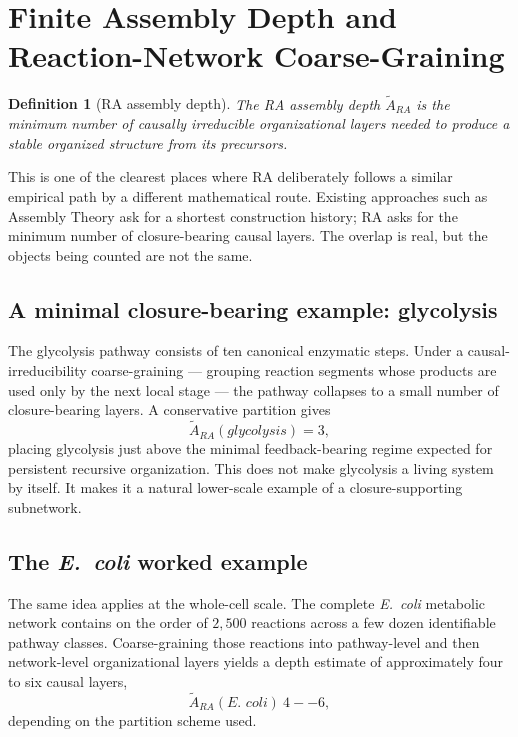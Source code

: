 \documentclass[11pt]{article}
\def\mathrm#1{#1}%
\def\text#1{#1}%
\def\approx{~}%
\newtheorem{definition}{Definition}
\begin{document}
\section{Finite Assembly Depth and Reaction-Network Coarse-Graining}
\label{sec:assembly}

\begin{definition}[RA assembly depth]
The RA assembly depth $\tilde{A}_{\mathrm{RA}}$ is the minimum number of causally irreducible organizational layers needed to produce a stable organized structure from its precursors.
\end{definition}

This is one of the clearest places where RA deliberately follows a similar empirical path by a different mathematical route. Existing approaches such as Assembly Theory ask for a shortest construction history; RA asks for the minimum number of closure-bearing causal layers. The overlap is real, but the objects being counted are not the same.

\subsection{A minimal closure-bearing example: glycolysis}

The glycolysis pathway consists of ten canonical enzymatic steps. Under a causal-irreducibility coarse-graining --- grouping reaction segments whose products are used only by the next local stage --- the pathway collapses to a small number of closure-bearing layers. A conservative partition gives
\[
\tilde{A}_{\mathrm{RA}}(\text{glycolysis}) = 3,
\]
placing glycolysis just above the minimal feedback-bearing regime expected for persistent recursive organization. This does not make glycolysis a living system by itself. It makes it a natural lower-scale example of a closure-supporting subnetwork.

\subsection{The \emph{E.~coli} worked example}
\label{sec:ecoli}

The same idea applies at the whole-cell scale. The complete \emph{E.~coli} metabolic network contains on the order of $2{,}500$ reactions across a few dozen identifiable pathway classes. Coarse-graining those reactions into pathway-level and then network-level organizational layers yields a depth estimate of approximately four to six causal layers,
\[
\tilde{A}_{\mathrm{RA}}(\textit{E.~coli}) \approx 4\text{--}6,
\]
depending on the partition scheme used.
\end{document}
